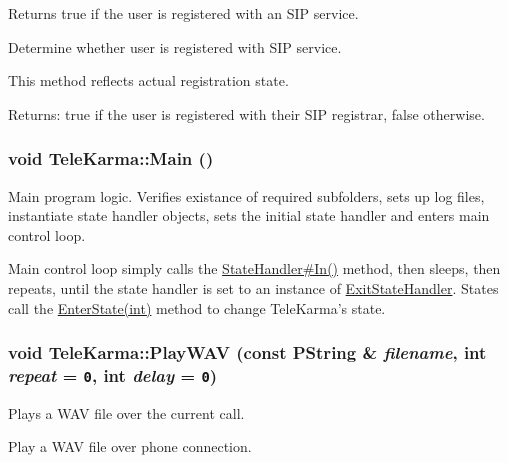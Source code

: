 Returns true if the user is registered with an SIP service. 

Determine whether user is registered with SIP service.

This method reflects actual registration state. \begin{Desc}
\item[Returns:]true if the user is registered with their SIP registrar, false otherwise. \end{Desc}
\hypertarget{classTeleKarma_addd554bf6335422cc896c894005a031}{
\subsubsection[{Main}]{\setlength{\rightskip}{0pt plus 5cm}void TeleKarma::Main ()}}
\label{classTeleKarma_addd554bf6335422cc896c894005a031}


Main program logic. Verifies existance of required subfolders, sets up log files, instantiate state handler objects, sets the initial state handler and enters main control loop. 

Main control loop simply calls the \hyperlink{classStateHandler_cee16f855e7354d21abafa47acd1046c}{StateHandler\#In()} method, then sleeps, then repeats, until the state handler is set to an instance of \hyperlink{classExitStateHandler}{ExitStateHandler}. States call the \hyperlink{classTeleKarma_22107597af9789cf4162ac2bb32f0482}{EnterState(int)} method to change TeleKarma's state.  \hypertarget{classTeleKarma_ca737d1deeb1da27f12d84f8c4b6819b}{
\subsubsection[{PlayWAV}]{\setlength{\rightskip}{0pt plus 5cm}void TeleKarma::PlayWAV (const PString \& {\em filename}, \/  int {\em repeat} = {\tt 0}, \/  int {\em delay} = {\tt 0})}}
\label{classTeleKarma_ca737d1deeb1da27f12d84f8c4b6819b}


Plays a WAV file over the current call. 

Play a WAV file over phone connection.

